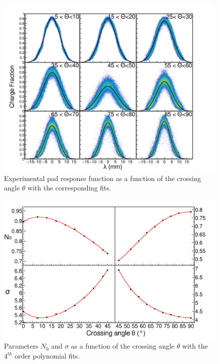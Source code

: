 \documentclass[review,number,sort&compress]{elsarticle}
\begin{document}
\begin{figure}[ht!]
\includegraphics[width=\linewidth]{fig6}
\caption{Experimental pad response function as a function of the crossing angle $\theta$ with the corresponding fits.}
\label{fig:prfangle}
\end{figure}


\begin{figure}[ht!]
\vspace{5mm}
\includegraphics[width=\linewidth]{fig7}
\caption{Parameters $N_{0}$ and $\sigma$ as a function of the crossing angle $\theta$ with the $4^{th}$ order polynomial fits.}
\label{fig:normsigma}
\end{figure}
\end{document}
